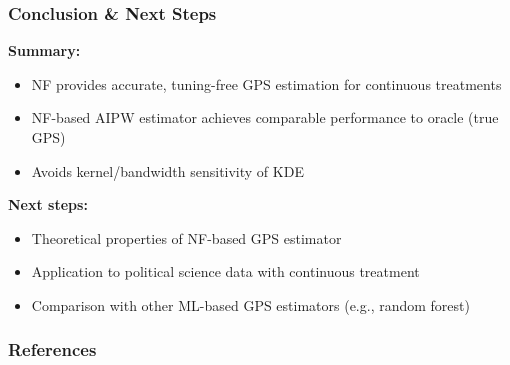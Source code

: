 \documentclass[10pt, handout]{beamer}
\begin{document}
\begin{frame}
  \frametitle{Conclusion \& Next Steps}

  \textbf{Summary:}
  \begin{itemize}
    \item NF provides accurate, tuning-free GPS estimation for continuous treatments
    \item NF-based AIPW estimator achieves comparable performance to oracle (true GPS)
    \item Avoids kernel/bandwidth sensitivity of KDE
  \end{itemize}

  \vspace{0.3cm}
  \textbf{Next steps:}
  \begin{itemize}
    \item Theoretical properties of NF-based GPS estimator
    \item Application to political science data with continuous treatment
    \item Comparison with other ML-based GPS estimators (e.g., random forest)
  \end{itemize}

\end{frame}

\begin{frame}%
  \frametitle{References}

  \scriptsize


  
  

\end{frame}
\end{document}
